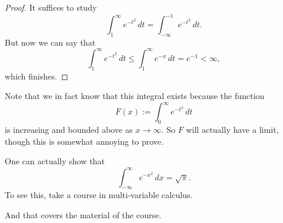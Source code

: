 \documentclass[../notes.tex]{subfiles}
\begin{document}
\begin{proof}
	It suffices to study
	\[\int_1^\infty e^{-t^2}\,dt=\int_{-\infty}^{-1}e^{-t^2}\,dt.\]
	But now we can say that
	\[\int_1^\infty e^{-t^2}\,dt\le\int_1^\infty e^{-x}\,dt=e^{-1}<\infty,\]
	which finishes.
\end{proof}
\begin{remark}
	Note that we in fact know that this integral exists because the function
	\[F(x):=\int_0^\infty e^{-t^2}\,dt\]
	is increasing and bounded above as $x\to\infty.$ So $F$ will actually have a limit, though this is somewhat annoying to prove.
\end{remark}
\begin{remark}
	One can actually show that
	\[\int_{-\infty}^\infty e^{-x^2}\,dx=\sqrt\pi.\]
	To see this, take a course in multi-variable calculus.
\end{remark}
And that covers the material of the course.
\end{document}
